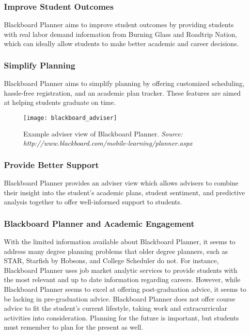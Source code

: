 \subsubsection{Improve Student Outcomes}
Blackboard Planner aims to improve student outcomes by providing students with real labor demand information from Burning Glass and Roadtrip Nation, which can ideally allow students to make better academic and career decisions.

\subsubsection{Simplify Planning}
Blackboard Planner aims to simplify planning by offering customized scheduling, hassle-free registration, and an academic plan tracker. These features are aimed at helping students graduate on time.

\begin{figure}[h]
\centering
\texttt{[image: blackboard\_adviser]}
\caption{Example adviser view of Blackboard Planner. \textit{Source: http://www.blackboard.com/mobile-learning/planner.aspx}}
\end{figure}

\subsubsection{Provide Better Support}
Blackboard Planner provides an adviser view which allows advisers to combine their insight into the student's academic plans, student sentiment, and predictive analysis together to offer well-informed support to students. 

\subsubsection{Blackboard Planner and Academic Engagement}
With the limited information available about Blackboard Planner, it seems to address many degree planning problems that older degree planners, such as STAR, Starfish by Hobsons, and College Scheduler do not. For instance, Blackboard Planner uses job market analytic services to provide students with the most relevant and up to date information regarding careers. However, while Blackboard Planner seems to excel at offering post-graduation advice, it seems to be lacking in pre-graduation advice. Blackboard Planner does not offer course advice to fit the student's current lifestyle, taking work and extracurricular activities into consideration. Planning for the future is important, but students must remember to plan for the present as well. 

